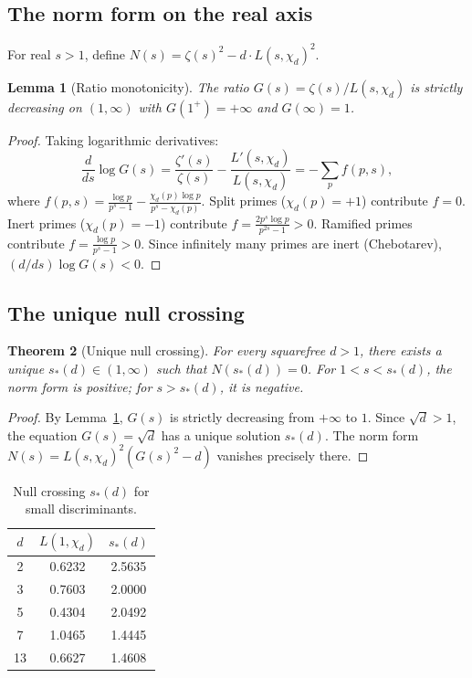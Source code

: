 \documentclass[12pt,reqno]{amsart}
\theoremstyle{plain}
\newtheorem{theorem}{Theorem}[section]
\newtheorem{lemma}[theorem]{Lemma}
\theoremstyle{definition}
\theoremstyle{remark}
\begin{document}
\subsection{The norm form on the real axis}

For real $s > 1$, define $N(s) = \zeta(s)^2 - d \cdot L(s, \chi_d)^2$.

\begin{lemma}[Ratio monotonicity]\label{lem:ratio-mono}
The ratio $G(s) = \zeta(s)/L(s, \chi_d)$ is strictly decreasing on $(1, \infty)$ with $G(1^+) = +\infty$ and $G(\infty) = 1$.
\end{lemma}

\begin{proof}
Taking logarithmic derivatives:
\[
\frac{d}{ds}\log G(s) = \frac{\zeta'(s)}{\zeta(s)} - \frac{L'(s,\chi_d)}{L(s,\chi_d)} = -\sum_p f(p,s),
\]
where $f(p,s) = \frac{\log p}{p^s - 1} - \frac{\chi_d(p)\log p}{p^s - \chi_d(p)}$. Split primes ($\chi_d(p) = +1$) contribute $f = 0$. Inert primes ($\chi_d(p) = -1$) contribute $f = \frac{2p^s\log p}{p^{2s} - 1} > 0$. Ramified primes contribute $f = \frac{\log p}{p^s - 1} > 0$. Since infinitely many primes are inert (Chebotarev), $(d/ds)\log G(s) < 0$.
\end{proof}

\subsection{The unique null crossing}

\begin{theorem}[Unique null crossing]\label{thm:null-crossing}
For every squarefree $d > 1$, there exists a unique $s_*(d) \in (1, \infty)$ such that $N(s_*(d)) = 0$. For $1 < s < s_*(d)$, the norm form is positive; for $s > s_*(d)$, it is negative.
\end{theorem}

\begin{proof}
By Lemma~\ref{lem:ratio-mono}, $G(s)$ is strictly decreasing from $+\infty$ to $1$. Since $\sqrt{d} > 1$, the equation $G(s) = \sqrt{d}$ has a unique solution $s_*(d)$. The norm form $N(s) = L(s,\chi_d)^2(G(s)^2 - d)$ vanishes precisely there.
\end{proof}

\begin{table}[ht]
\centering
\begin{tabular}{c c c}
\hline
$d$ & $L(1,\chi_d)$ & $s_*(d)$ \\
\hline
2 & 0.6232 & 2.5635 \\
3 & 0.7603 & 2.0000 \\
5 & 0.4304 & 2.0492 \\
7 & 1.0465 & 1.4445 \\
13 & 0.6627 & 1.4608 \\
\hline
\end{tabular}
\caption{Null crossing $s_*(d)$ for small discriminants.}\label{table:null-crossing}
\end{table}
\end{document}
